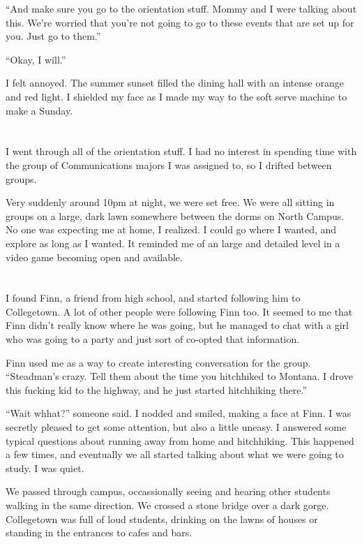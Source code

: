 ``And make sure you go to the orientation stuff.  Mommy and I were talking about
this.  We're worried that you're not going to go to these events that are set up
for you.  Just go to them.''

``Okay, I will.''

I felt annoyed.  The summer sunset filled the dining hall with an intense orange
and red light.  I shielded my face as I made my way to the soft serve machine to
make a Sunday.

\section{}

I went through all of the orientation stuff.  I had no interest in spending
time with the group of Communications majors I was assigned to, so I drifted
between groups. 

Very suddenly around 10pm at night, we were set free.  We were all sitting in
groups on a large, dark lawn somewhere between the dorms on North Campus.  No
one was expecting me at home, I realized.  I could go where I wanted, and
explore as long as I wanted.  It reminded me of an large and detailed level in a
video game becoming open and available.

\section{}

I found Finn, a friend from high school, and started following him to
Collegetown.  A lot of other people were following Finn too.  It seemed to me
that Finn didn't really know where he was going, but he managed to chat with a
girl who was going to a party and just sort of co-opted that information.  

Finn used me as a way to create interesting conversation for the group.
``Steadman's crazy.  Tell them about the time you hitchhiked to Montana.  I
drove this fucking kid to the highway, and he just started hitchhiking there.''

``Wait whhat?'' someone said.  I nodded and smiled, making a face at Finn.  I
was secretly pleased to get some attention, but also a little uneasy.  I
answered some typical questions about running away from home and hitchhiking.
This happened a few times, and eventually we all started talking about what we
were going to study.  I was quiet. 

We passed through campus, occassionally seeing and hearing other students
walking in the same direction.  We crossed a stone bridge over a dark gorge.
Collegetown was full of loud students, drinking on the lawns of houses or
standing in the entrances to cafes and bars.

